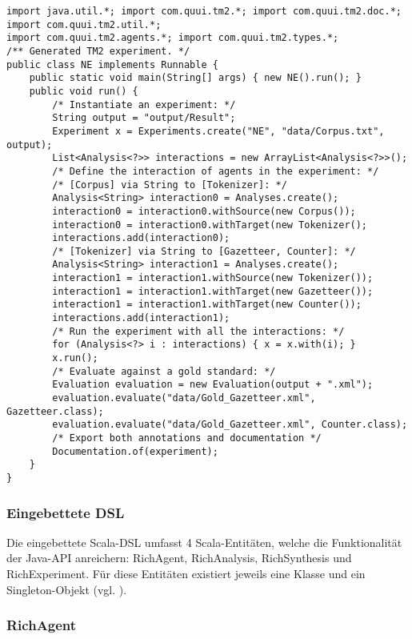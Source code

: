 \documentclass[abstracton, 12pt]{scrartcl}
\begin{document}
\begin{lstlisting}
import java.util.*; import com.quui.tm2.*; import com.quui.tm2.doc.*; import com.quui.tm2.util.*;
import com.quui.tm2.agents.*; import com.quui.tm2.types.*;
/** Generated TM2 experiment. */
public class NE implements Runnable {
    public static void main(String[] args) { new NE().run(); }
    public void run() {
        /* Instantiate an experiment: */
        String output = "output/Result";
        Experiment x = Experiments.create("NE", "data/Corpus.txt", output);
        List<Analysis<?>> interactions = new ArrayList<Analysis<?>>();
        /* Define the interaction of agents in the experiment: */
        /* [Corpus] via String to [Tokenizer]: */
        Analysis<String> interaction0 = Analyses.create();
        interaction0 = interaction0.withSource(new Corpus());
        interaction0 = interaction0.withTarget(new Tokenizer();
        interactions.add(interaction0);
        /* [Tokenizer] via String to [Gazetteer, Counter]: */
        Analysis<String> interaction1 = Analyses.create();
        interaction1 = interaction1.withSource(new Tokenizer());
        interaction1 = interaction1.withTarget(new Gazetteer());
        interaction1 = interaction1.withTarget(new Counter());
        interactions.add(interaction1);
        /* Run the experiment with all the interactions: */
        for (Analysis<?> i : interactions) { x = x.with(i); }
        x.run();
        /* Evaluate against a gold standard: */
        Evaluation evaluation = new Evaluation(output + ".xml");
        evaluation.evaluate("data/Gold_Gazetteer.xml", Gazetteer.class);
        evaluation.evaluate("data/Gold_Gazetteer.xml", Counter.class);
        /* Export both annotations and documentation */
        Documentation.of(experiment);
    }
}
\end{lstlisting}

\subsubsection{Eingebettete DSL} \label{anhang-embedded-dsl}

Die eingebettete Scala-DSL umfasst 4 Scala-Entitäten, welche die Funktionalität der Java-API anreichern: RichAgent, RichAnalysis, RichSynthesis und RichExperiment. Für diese Entitäten existiert jeweils eine Klasse und ein Singleton-Objekt (vgl. \citealt[59]{OderskyEtAl2008}).

\subsubsection{RichAgent}
\end{document}
